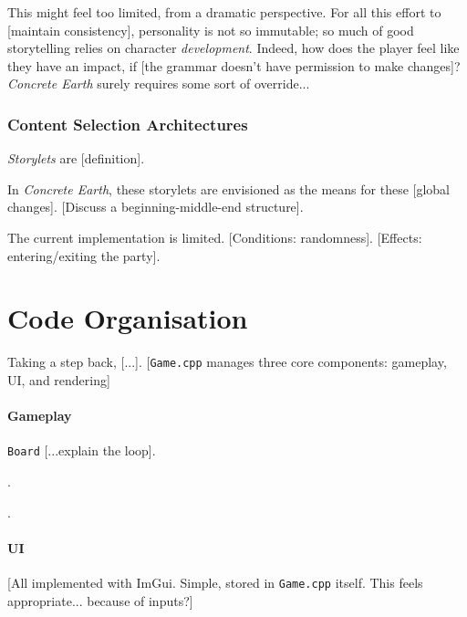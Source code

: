\documentclass[a4paper, 11pt]{article}
\begin{document}
\begin{flushleft}
\vspace{5pt}\noindent
This might feel too limited, from a dramatic perspective. For all this effort to [maintain consistency], personality is not so immutable; so much of good storytelling relies on character \textit{development}.
Indeed, how does the player feel like they have an impact, if [the grammar doesn't have permission to make changes]? \textit{Concrete Earth} surely requires some sort of override...

\subsubsection{Content Selection Architectures} \textit{Storylets} \citep{kreminskiStorylets} are [definition].

\vspace{5pt}\noindent
In \textit{Concrete Earth}, these storylets are envisioned as the means for these [global changes]. [Discuss a beginning-middle-end structure].%
 
\vspace{5pt}\noindent
The current implementation is limited. [Conditions: randomness]. [Effects: entering/exiting the party].

\section{Code Organisation}

Taking a step back, [...]. [\texttt{Game.cpp} manages three core components: gameplay, UI, and rendering]

\paragraph{Gameplay} \texttt{Board} [...explain the loop].

\vspace{5pt}.

\vspace{5pt}.

\paragraph{UI} [All implemented with ImGui. Simple, stored in \texttt{Game.cpp} itself. This feels appropriate... because of inputs?]


\end{flushleft}
\end{document}

